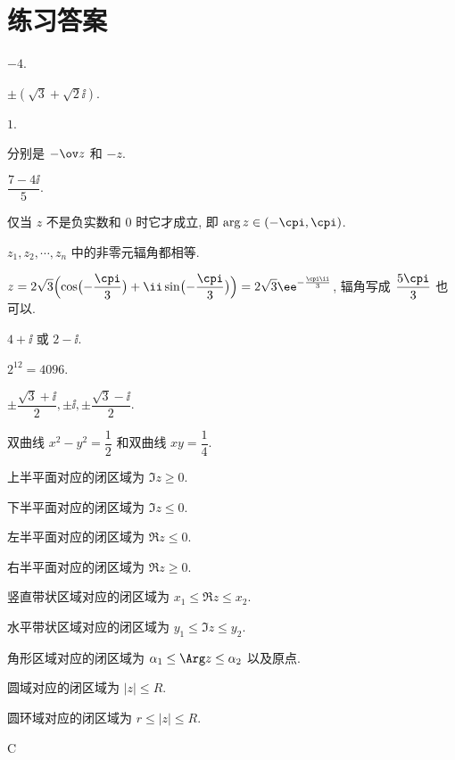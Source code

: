 \chapter{练习答案}

\begin{multicols}{2}

\setcounter{chapter}{0}

\begin{exerciseanswer}
  \item $-4$.
  \item $\pm(\sqrt3+\sqrt2\ii)$.
  \item $1$.
  \item 分别是 $-\ov z$ 和 $-z$.
  \item $\dfrac{7-4\ii}5$.
  \item 仅当 $z$ 不是负实数和 $0$ 时它才成立, 即 $\arg z\in(-\cpi,\cpi)$.
  \item $z_1,z_2,\cdots,z_n$ 中的非零元辐角都相等.
  \item $\displaystyle z=2\sqrt3\Bigl(\cos\bigl(-\frac\cpi3\bigr)+\ii\sin\bigl(-\frac\cpi3\bigr)\Bigr)=2\sqrt3\ee^{-\frac{\cpi\ii}3}$, 辐角写成 $\dfrac{5\cpi}3$ 也可以.
  \item $4+\ii$ 或 $2-\ii$.
  \item $2^{12}=4096$.
  \item $\pm\dfrac{\sqrt3+\ii}2,\pm \ii,\pm\dfrac{\sqrt3-\ii}2$.
  \item 双曲线 $x^2-y^2=\dfrac12$ 和双曲线 $xy=\dfrac14$.
  \item \delspace
    \begin{enumnopar}[(i)]
      \item 上半平面对应的闭区域为 $\Im z\ge0$.
      \item 下半平面对应的闭区域为 $\Im z\le0$.
      \item 左半平面对应的闭区域为 $\Re z\le0$.
      \item 右半平面对应的闭区域为 $\Re z\ge0$.
      \item 竖直带状区域对应的闭区域为 $x_1\le\Re z\le x_2$.
      \item 水平带状区域对应的闭区域为 $y_1\le\Im z\le y_2$.
      \item 角形区域对应的闭区域为 $\alpha_1\le \Arg z\le \alpha_2$ 以及原点.
      \item 圆域对应的闭区域为 $|z|\le R$.
      \item 圆环域对应的闭区域为 $r\le|z|\le R$.
    \end{enumnopar}
  \item C
  \item \delspace

\end{exerciseanswer}
\end{multicols}

